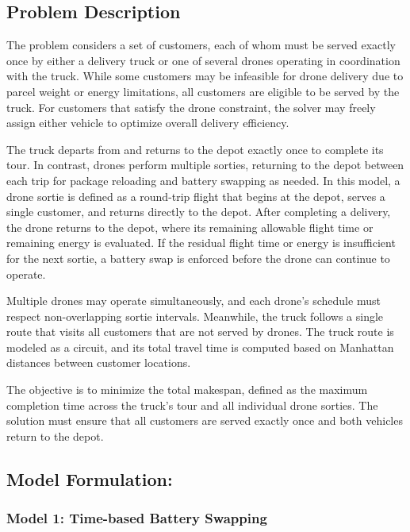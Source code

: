 \documentclass[3p, authoryear, 11pt]{elsarticle}
\begin{document}
\subsection{Problem Description}

The problem considers a set of customers, each of whom must be served exactly once by either a delivery truck or one of several drones operating in coordination with the truck. While some customers may be infeasible for drone delivery due to parcel weight or energy limitations, all customers are eligible to be served by the truck. For customers that satisfy the drone constraint, the solver may freely assign either vehicle to optimize overall delivery efficiency.

The truck departs from and returns to the depot exactly once to complete its tour. In contrast, drones perform multiple sorties, returning to the depot between each trip for package reloading and battery swapping as needed. In this model, a drone sortie is defined as a round-trip flight that begins at the depot, serves a single customer, and returns directly to the depot. After completing a delivery, the drone returns to the depot, where its remaining allowable flight time or remaining energy is evaluated. If the residual flight time or energy is insufficient for the next sortie, a battery swap is enforced before the drone can continue to operate.

Multiple drones may operate simultaneously, and each drone’s schedule must respect non-overlapping sortie intervals. Meanwhile, the truck follows a single route that visits all customers that are not served by drones. The truck route is modeled as a circuit, and its total travel time is computed based on Manhattan distances between customer locations.

The objective is to minimize the total makespan, defined as the maximum completion time across the truck’s tour and all individual drone sorties. The solution must ensure that all customers are served exactly once and both vehicles return to the depot.

\subsection{Model Formulation:}
\label{sec:model_formulation_math}
\subsubsection{Model 1: Time-based Battery Swapping }
\label{sec:time_model_math}
\end{document}
